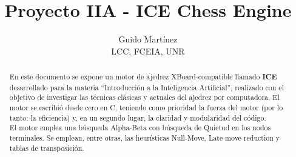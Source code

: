 \documentclass{article}
\newcommand{\ICE}[0]{{\bf ICE}}
\begin{document}
\title{Proyecto IIA - ICE Chess Engine}

\author{Guido Martínez \\ LCC, FCEIA, UNR }

\maketitle

\begin{abstract}
En este documento se expone un motor de ajedrez
XBoard\cite{protocol}-compatible llamado \ICE{} desarrollado para la
materia ``Introducción a la Inteligencia Artificial'', realizado con el
objetivo de investigar las técnicas clásicas y actuales del ajedrez
por computadora. El motor se escribió desde cero en C, teniendo como
prioridad la fuerza del motor (por lo tanto: la eficiencia) y, en un
segundo lugar, la claridad y modularidad del código.
\\

El motor emplea una búsqueda Alpha-Beta con búsqueda de Quietud en los
nodos terminales. Se emplean, entre otras, las heurísticas Null-Move,
Late move reduction y tablas de transposición.
\end{abstract}
\end{document}
